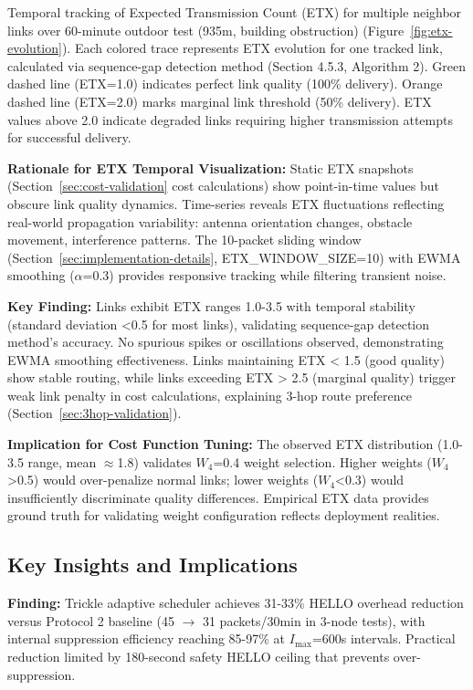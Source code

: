 Temporal tracking of Expected Transmission Count (ETX) for multiple neighbor links over 60-minute outdoor test (935m, building obstruction) (Figure~\ref{fig:etx-evolution}). Each colored trace represents ETX evolution for one tracked link, calculated via sequence-gap detection method (Section 4.5.3, Algorithm 2). Green dashed line (ETX=1.0) indicates perfect link quality (100\% delivery). Orange dashed line (ETX=2.0) marks marginal link threshold (50\% delivery). ETX values above 2.0 indicate degraded links requiring higher transmission attempts for successful delivery.

\textbf{Rationale for ETX Temporal Visualization:} Static ETX snapshots (Section~\ref{sec:cost-validation} cost calculations) show point-in-time values but obscure link quality dynamics. Time-series reveals ETX fluctuations reflecting real-world propagation variability: antenna orientation changes, obstacle movement, interference patterns. The 10-packet sliding window (Section~\ref{sec:implementation-details}, ETX\_WINDOW\_SIZE=10) with EWMA smoothing ($\alpha$=0.3) provides responsive tracking while filtering transient noise.

\textbf{Key Finding:} Links exhibit ETX ranges 1.0-3.5 with temporal stability (standard deviation <0.5 for most links), validating sequence-gap detection method's accuracy. No spurious spikes or oscillations observed, demonstrating EWMA smoothing effectiveness. Links maintaining ETX < 1.5 (good quality) show stable routing, while links exceeding ETX > 2.5 (marginal quality) trigger weak link penalty in cost calculations, explaining 3-hop route preference (Section~\ref{sec:3hop-validation}).

\textbf{Implication for Cost Function Tuning:} The observed ETX distribution (1.0-3.5 range, mean $\approx$1.8) validates $W_4$=0.4 weight selection. Higher weights ($W_4$>0.5) would over-penalize normal links; lower weights ($W_4$<0.3) would insufficiently discriminate quality differences. Empirical ETX data provides ground truth for validating weight configuration reflects deployment realities.

\subsection{Key Insights and Implications}

\textbf{Finding:} Trickle adaptive scheduler achieves 31-33\% HELLO overhead reduction versus Protocol 2 baseline (45 $\rightarrow$ 31 packets/30min in 3-node tests), with internal suppression efficiency reaching 85-97\% at $I_{\max}$=600s intervals. Practical reduction limited by 180-second safety HELLO ceiling that prevents over-suppression.

